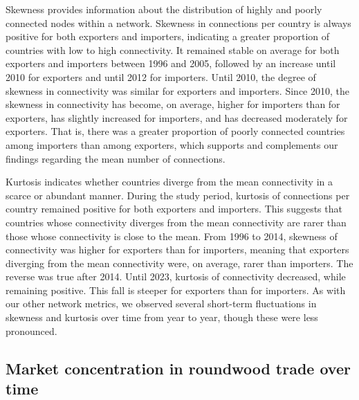 \documentclass[
  authoryear,
  review,
  3p]{elsarticle}
\begin{document}
Skewness provides information about the distribution of highly and
poorly connected nodes within a network. Skewness in connections per
country is always positive for both exporters and importers, indicating
a greater proportion of countries with low to high connectivity. It
remained stable on average for both exporters and importers between 1996
and 2005, followed by an increase until 2010 for exporters and until
2012 for importers. Until 2010, the degree of skewness in connectivity
was similar for exporters and importers. Since 2010, the skewness in
connectivity has become, on average, higher for importers than for
exporters, has slightly increased for importers, and has decreased
moderately for exporters. That is, there was a greater proportion of
poorly connected countries among importers than among exporters, which
supports and complements our findings regarding the mean number of
connections.

Kurtosis indicates whether countries diverge from the mean connectivity
in a scarce or abundant manner. During the study period, kurtosis of
connections per country remained positive for both exporters and
importers. This suggests that countries whose connectivity diverges from
the mean connectivity are rarer than those whose connectivity is close
to the mean. From 1996 to 2014, skewness of connectivity was higher for
exporters than for importers, meaning that exporters diverging from the
mean connectivity were, on average, rarer than importers. The reverse
was true after 2014. Until 2023, kurtosis of connectivity decreased,
while remaining positive. This fall is steeper for exporters than for
importers. As with our other network metrics, we observed several
short-term fluctuations in skewness and kurtosis over time from year to
year, though these were less pronounced.

\subsection{Market concentration in roundwood trade over
time}\label{market-concentration-in-roundwood-trade-over-time}
\end{document}
